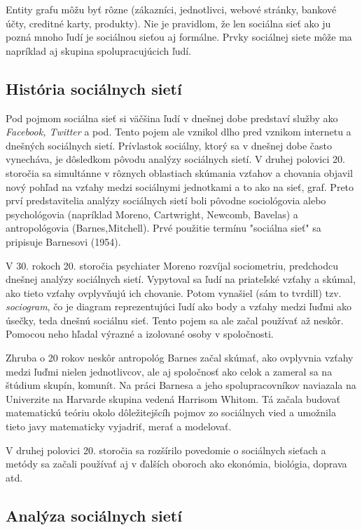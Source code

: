 \documentclass[slovak,master,public,dept460,male,cpdeclaration,oneside]{diploma}
\begin{document}
Entity grafu môžu byť rôzne (zákazníci, jednotlivci, webové stránky, bankové účty, creditné karty,
produkty). Nie je pravidlom, že len sociálna sieť ako ju pozná mnoho ľudí je sociálnou sieťou aj formálne. Prvky sociálnej siete môže ma napríklad aj skupina spolupracujúcich ľudí. 

\subsection{História sociálnych sietí}

Pod pojmom sociálna sieť si väčšina ľudí v dnešnej dobe predstaví služby ako \textit{Facebook, Twitter} a pod. Tento pojem ale vznikol dlho pred vznikom internetu a dnešných sociálnych sietí. Prívlastok sociálny, ktorý sa v dnešnej dobe často vynecháva, je dôsledkom pôvodu analýzy sociálnych sietí. V druhej polovici 20. storočia sa simultánne v rôznych oblastiach skúmania vzťahov a chovania objavil nový pohľad na vzťahy medzi sociálnymi jednotkami a to ako na sieť, graf. Preto prví predstavitelia analýzy sociálnych sietí boli pôvodne sociológovia alebo psychológovia (napríklad Moreno, Cartwright, Newcomb, Bavelas) a antropológovia (Barnes,Mitchell). Prvé použitie termínu "sociálna sieť" sa pripisuje Barnesovi (1954).

V 30. rokoch 20. storočia psychiater Moreno rozvíjal sociometriu, predchodcu dnešnej analýzy sociálnych sietí. Vypytoval sa ľudí na priateľské vzťahy a skúmal, ako tieto vzťahy ovplyvňujú ich chovanie. Potom vynašiel (sám to tvrdill) tzv. \textit{sociogram}, čo je diagram reprezentujúci ľudí ako body a vzťahy medzi ľuďmi ako úsečky, teda dnešnú sociálnu sieť. Tento pojem sa ale začal používať až neskôr. Pomocou neho hľadal výrazné a izolované osoby v spoločnosti.

Zhruba o 20 rokov neskôr antropológ Barnes začal skúmať, ako ovplyvnia vzťahy medzi ľuďmi nielen jednotlivcov, ale aj spoločnosť ako celok a zameral sa na štúdium skupín, komunít. Na práci Barnesa a jeho spolupracovníkov naviazala na Univerzite na Harvarde skupina vedená Harrisom Whitom. Tá začala budovať matematickú teóriu okolo dôležitejšcíh pojmov zo sociálnych vied a umožnila tieto javy matematicky vyjadriť, merať a modelovať.

V druhej polovici 20. storočia sa rozšírilo povedomie o sociálnych sieťach a metódy sa začali používať aj v ďalších oboroch ako ekonómia, biológia, doprava atd.

\subsection{Analýza sociálnych sietí}
\end{document}
